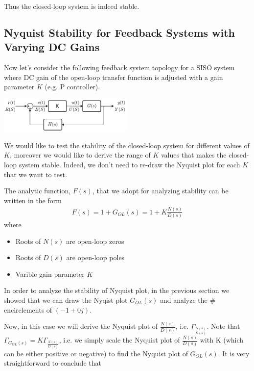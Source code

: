 \documentclass[twoside]{article}
\begin{document}
Thus the closed-loop system is indeed stable.

\newpage

\subsection{Nyquist Stability for Feedback Systems with Varying DC
Gains}

Now let's consider the following feedback system topology for a SISO
system where DC gain of the open-loop transfer function is adjusted
with a gain parameter $K$ (e.g. P controller). 

\vspace{6 pt}

  \begin{minipage}[h]{1\linewidth}
    \begin{center}
      \includegraphics[width=0.5\textwidth]{P}
    \end{center}
  \end{minipage}

\vspace{6 pt}

We would like to test the stability of the closed-loop system
for different values of $K$, moreover we would like to derive 
the range of $K$ values that makes the closed-loop system 
stable. Indeed, we don't need to re-draw the Nyquist plot
for each $K$ that we want to test. 


The analytic function, $F(s)$, that we adopt for analyzing stability 
can be written in the form  
%
\begin{align*}
  F(s) = 1 + G_{OL}(s) = 1 + K \frac{ N(s) }{ D(s) } 
\end{align*}
%
where 
\begin{itemize}
  \item Roots of $N(s)$ are open-loop zeros
  \item Roots of $D(s)$ are open-loop poles
  \item Varible gain parameter $K$
\end{itemize}
%
In order to analyze the stability of Nyquist plot,
in the previous section we showed that 
we can draw the Nyqist plot $G_{OL}(s)$
and analyze the $\#$ encirclements of $(-1 + 0 j)$.

Now, in this case we will derive the Nyquist plot of 
$\frac{N(s)}{D(s)}$, i.e. $\Gamma_{\frac{N(s)}{D(s)}}$. 
Note that $\Gamma_{G_{OL}(s)} = K \Gamma_{\frac{N(s)}{D(s)}}$,
i.e. we simply scale the Nyquist plot of $\frac{N(s)}{D(s)}$
with K (which can be either positive or negative) to find the
Nyquist plot of $G_{OL}(s)$. It is very straightforward to
conclude that 
\end{document}
